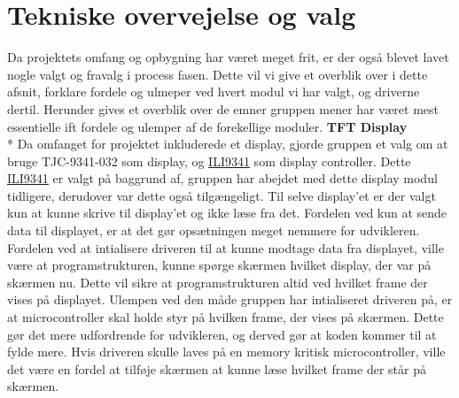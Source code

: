 \graphicspath{{Chapters/Alternative/}}


\section{Tekniske overvejelse og valg}
Da projektets omfang og opbygning har været meget frit, er der også blevet lavet nogle valgt og fravalg i process fasen. Dette vil vi give et overblik over i dette afsnit, forklare fordele og ulmeper ved hvert modul vi har valgt, og driverne dertil. Herunder gives et overblik over de emner gruppen mener har været mest essentielle ift fordele og ulemper af de forekellige moduler. 
\newline
\newline
\textbf{TFT Display} \\*
Da omfanget for projektet inkluderede et display, gjorde gruppen et valg om at bruge TJC-9341-032 som display, og \href{https://blackboard.au.dk/bbcswebdav/pid-1697983-dt-content-rid-3847230_1/courses/BB-Cou-UUVA-73302/BB-Cou-UUVA-65758_ImportedContent_20170106021228/BB-Cou-STADS-UUVA-52360_ImportedContent_20160107025559/LAB/Lab3a%20Graphic%20LCD%20Display/Files%20for%20LAB3a/ILI9341_v1.11.pdf}{ILI9341} 
som display controller. Dette \href{https://blackboard.au.dk/bbcswebdav/pid-1697983-dt-content-rid-3847230_1/courses/BB-Cou-UUVA-73302/BB-Cou-UUVA-65758_ImportedContent_20170106021228/BB-Cou-STADS-UUVA-52360_ImportedContent_20160107025559/LAB/Lab3a%20Graphic%20LCD%20Display/Files%20for%20LAB3a/ILI9341_v1.11.pdf}{ILI9341} 
er valgt på baggrund af, gruppen har abejdet med dette display modul tidligere, derudover var dette også tilgængeligt.
Til selve display'et er der valgt kun at kunne skrive til display'et og ikke læse fra det. Fordelen ved kun at sende data til displayet, er at det gør opsætningen meget nemmere for udvikleren. \\
Fordelen ved at intialisere driveren til at kunne modtage data fra displayet, ville være at programstrukturen, kunne spørge skærmen hvilket display, der var på skærmen nu. Dette vil sikre at programstrukturen altid ved hvilket frame der vises på displayet. Ulempen ved den måde gruppen har intialiseret driveren på, er at microcontroller skal holde styr på hvilken frame, der vises på skærmen. Dette gør det mere udfordrende for udvikleren, og derved gør at koden kommer til at fylde mere. Hvis driveren skulle laves på en memory kritisk microcontroller, ville det være en fordel at tilføje skærmen at kunne læse hvilket frame der står på skærmen. \\
